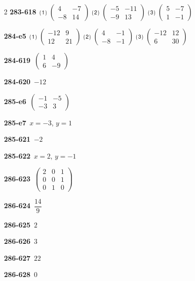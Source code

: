 \documentclass[10pt,a4paper]{article}
\begin{document}
\begin{multicols}{2}
\noindent\textbf{283-618}\ ⑴ $\begin{pmatrix} 4 & -7 \\ -8 & 14 \end{pmatrix}$ ⑵ $\begin{pmatrix} -5 & -11 \\ -9 & 13 \end{pmatrix}$ ⑶ $\begin{pmatrix} 5 & -7 \\ 1 & -1 \end{pmatrix}$\par
\noindent\textbf{284-e5}\ ⑴ $\begin{pmatrix} -12 & 9 \\ 12 & 21 \end{pmatrix}$ ⑵ $\begin{pmatrix} 4 & -1 \\ -8 & -1 \end{pmatrix}$ ⑶ $\begin{pmatrix} -12 & 12 \\ 6 & 30 \end{pmatrix}$\par
\noindent\textbf{284-619}\ $\begin{pmatrix} 1 & 4 \\ 6 & -9 \end{pmatrix}$\par
\noindent\textbf{284-620}\ $-12$\par
\noindent\textbf{285-e6}\ $\begin{pmatrix} -1 & -5 \\ -3 & 3 \end{pmatrix}$\par
\noindent\textbf{285-e7}\ $x=-3$, $y=1$\par
\noindent\textbf{285-621}\ $-2$\par
\noindent\textbf{285-622}\ $x=2$, $y=-1$\par
\noindent\textbf{286-623}\ $\begin{pmatrix} 2 & 0 & 1 \\ 0 & 0 & 1 \\ 0 & 1 & 0 \end{pmatrix}$\par
\noindent\textbf{286-624}\ $\dfrac{14}{9}$\par
\noindent\textbf{286-625}\ $2$\par
\noindent\textbf{286-626}\ $3$\par
\noindent\textbf{286-627}\ $22$\par
\noindent\textbf{286-628}\ $0$\par

\end{multicols}
\end{document}
